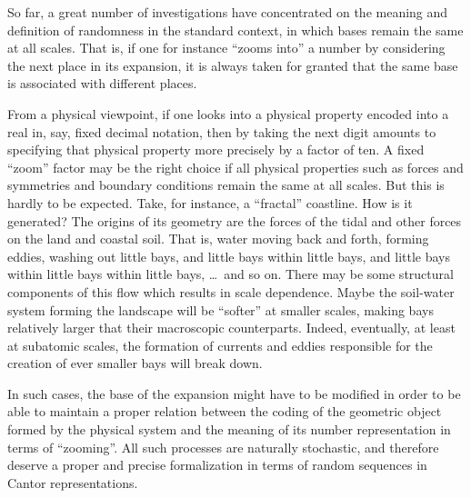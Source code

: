\documentclass{elsart}
\begin{document}
So far, a great number of investigations have concentrated on the meaning
and definition of randomness in the standard context, in which bases remain
the same at all scales. That is, if one for instance ``zooms into''  a
number by considering the next place in its expansion, it is always  taken
for granted that the same base is associated with different places.

 From a physical viewpoint, if one looks into a physical property encoded
into a real in, say, fixed decimal notation,  then by taking the next digit
amounts to specifying that physical property more precisely by a factor of
ten. A fixed ``zoom'' factor may be the right choice if all physical
properties such as  forces and symmetries and boundary conditions remain
the same at all scales. But this is hardly to be expected. Take, for
instance, a ``fractal'' coastline. How is it generated? The origins of its
geometry are the forces of the tidal and other forces on the land and
coastal soil. That is, water moving back and forth, forming eddies, washing
out little bays, and little bays within little bays, and little bays within
little bays within little bays, \ldots \, and so on. There may be some structural
components of this flow which results in scale dependence. Maybe the
soil-water system forming the landscape will be ``softer'' at smaller
scales, making bays relatively larger that their macroscopic
counterparts.  Indeed, eventually, at least at subatomic scales, the
formation of currents and eddies responsible for the creation of ever
smaller bays will break down.

In such cases, the base of the expansion might have to be modified in order
to be able to maintain a proper relation between the coding of the
geometric object formed by the physical system and the meaning of its number
representation in terms of ``zooming''.  All such processes are naturally
stochastic, and therefore deserve a proper and precise formalization in
terms of random sequences in Cantor representations.




%
%
%
\end{document}
